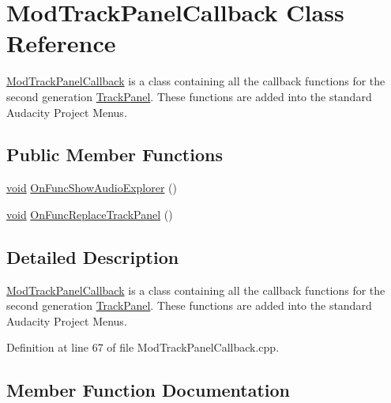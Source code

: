 \hypertarget{class_mod_track_panel_callback}{}\section{Mod\+Track\+Panel\+Callback Class Reference}
\label{class_mod_track_panel_callback}


\hyperlink{class_mod_track_panel_callback}{Mod\+Track\+Panel\+Callback} is a class containing all the callback functions for the second generation \hyperlink{class_track_panel}{Track\+Panel}. These functions are added into the standard Audacity Project Menus.  


\subsection*{Public Member Functions}
\begin{DoxyCompactItemize}
\item 
\hyperlink{sound_8c_ae35f5844602719cf66324f4de2a658b3}{void} \hyperlink{class_mod_track_panel_callback_a4c84df3e11671cc4fd631751e4a94193}{On\+Func\+Show\+Audio\+Explorer} ()
\item 
\hyperlink{sound_8c_ae35f5844602719cf66324f4de2a658b3}{void} \hyperlink{class_mod_track_panel_callback_ad23e180b0fdd5006894dbdcf8abd89c9}{On\+Func\+Replace\+Track\+Panel} ()
\end{DoxyCompactItemize}


\subsection{Detailed Description}
\hyperlink{class_mod_track_panel_callback}{Mod\+Track\+Panel\+Callback} is a class containing all the callback functions for the second generation \hyperlink{class_track_panel}{Track\+Panel}. These functions are added into the standard Audacity Project Menus. 

Definition at line 67 of file Mod\+Track\+Panel\+Callback.\+cpp.



\subsection{Member Function Documentation}
